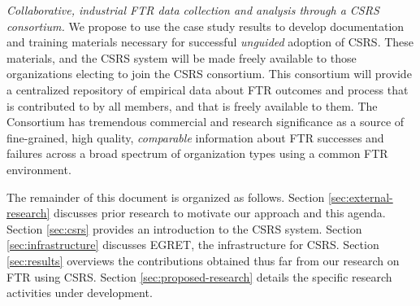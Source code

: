 \begin{itemizenoindent}
\item {\em Collaborative, industrial FTR data collection and analysis
  through a CSRS consortium.} We propose to use the case study results to
  develop documentation and training materials necessary for successful
  {\em unguided}\/ adoption of CSRS.  These materials, and the CSRS system
  will be made freely available to those organizations electing to join the
  CSRS consortium. This consortium will provide a centralized repository of
  empirical data about FTR outcomes and process that is contributed to by
  all members, and that is freely available to them.  The Consortium has
  tremendous commercial and research significance as a source of
  fine-grained, high quality, {\em comparable}\/ information about FTR
  successes and failures across a broad spectrum of organization types
  using a common FTR environment.

\end{itemizenoindent}

The remainder of this document is organized as follows.  Section
\ref{sec:external-research} discusses prior research to motivate our
approach and this agenda.  Section \ref{sec:csrs} provides an introduction
to the CSRS system.  Section \ref{sec:infrastructure} discusses EGRET, the
infrastructure for CSRS.  Section \ref{sec:results} overviews the
contributions obtained thus far from our research on FTR using CSRS.
Section \ref{sec:proposed-research} details the specific research
activities under development.








 


